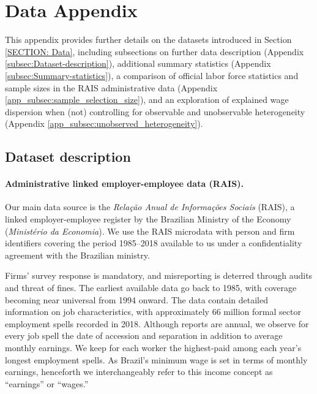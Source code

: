 
\section{Data Appendix\label{APPENDIX: Data}}

This appendix provides further details on the datasets introduced in Section \ref{SECTION: Data}, including subsections on %
%
further data description (Appendix \ref{subsec:Dataset-description}), %
%
additional summary statistics (Appendix \ref{subsec:Summary-statistics}), %
%
a comparison of official labor force statistics and sample sizes in the RAIS administrative data (Appendix \ref{app_subsec:sample_selection_size}), and%
%
an exploration of explained wage dispersion when (not) controlling for observable and unobservable heterogeneity (Appendix \ref{app_subsec:unobserved_heterogeneity}). %


\clearpage
\subsection{Dataset description\label{subsec:Dataset-description}}

\paragraph{Administrative linked employer-employee data (RAIS).}

Our main data source is the \textit{Rela}\emph{\c{c}\~{a}}\textit{o
Anual de Informa}\emph{\c{c}\~{o}}\textit{es Sociais} (RAIS), a linked
employer-employee register by the Brazilian Ministry of the Economy (\emph{Minist\'{e}rio
da Economia}). We use the RAIS microdata with person
and firm identifiers covering the period 1985--2018 available to
us under a confidentiality agreement with the Brazilian ministry.

Firms' survey response is mandatory, and misreporting is deterred
through audits and threat of fines. The earliest available data go back to 1985, with
coverage becoming near universal from 1994 onward. The data contain
detailed information on job characteristics, with approximately 66 million formal
sector employment spells recorded in 2018. Although reports are annual,
we observe for every job spell the date of accession and separation
in addition to average monthly earnings. We keep for each worker the
highest-paid among each year's longest employment spells. As Brazil's
minimum wage is set in terms of monthly earnings, henceforth we interchangeably
refer to this income concept as ``earnings'' or ``wages.''


